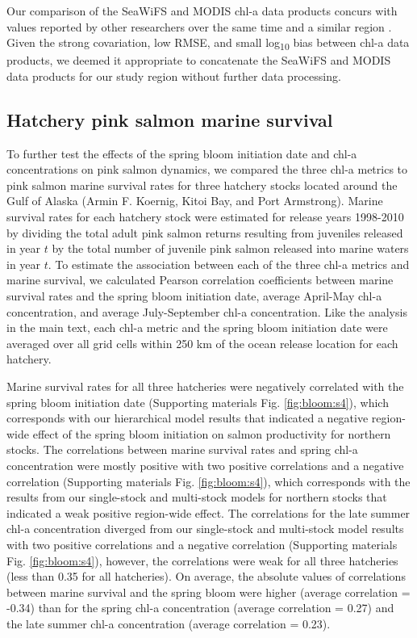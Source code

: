 Our comparison of the SeaWiFS and MODIS chl-a data products concurs with values
reported by other researchers over the same time and a similar region
\citep{Waite2013}. Given the strong covariation, low RMSE, and small
log\textsubscript{10} bias between chl-a data products, we deemed it appropriate
to concatenate the SeaWiFS and MODIS data products for our study region without
further data processing.


\subsection{Hatchery pink salmon marine survival}
\label{supp:bloom:B}

To further test the effects of the spring bloom initiation date and chl-a
concentrations on pink salmon dynamics, we compared the three chl-a metrics to
pink salmon marine survival rates for three hatchery stocks located around the
Gulf of Alaska (Armin F. Koernig, Kitoi Bay, and Port Armstrong). Marine
survival rates for each hatchery stock were estimated for release years
1998-2010 by dividing the total adult pink salmon returns resulting from
juveniles released in year \(t\) by the total number of juvenile pink salmon
released into marine waters in year \(t\). To estimate the association between
each of the three chl-a metrics and marine survival, we calculated Pearson
correlation coefficients between marine survival rates and the spring bloom
initiation date, average April-May chl-a concentration, and average
July-September chl-a concentration. Like the analysis in the main text, each
chl-a metric and the spring bloom initiation date were averaged over all grid
cells within 250 km of the ocean release location for each hatchery.

Marine survival rates for all three hatcheries were negatively correlated with
the spring bloom initiation date (Supporting materials Fig.
\ref{fig:bloom:s4}), which corresponds with our hierarchical model results that
indicated a negative region-wide effect of the spring bloom initiation on salmon
productivity for northern stocks. The correlations between marine survival rates
and spring chl-a concentration were mostly positive with two positive
correlations and a negative correlation (Supporting materials Fig.
\ref{fig:bloom:s4}), which corresponds with the results from our single-stock
and multi-stock models for northern stocks that indicated a weak positive
region-wide effect. The correlations for the late summer chl-a concentration
diverged from our single-stock and multi-stock model results with two positive
correlations and a negative correlation (Supporting materials Fig.
\ref{fig:bloom:s4}), however, the correlations were weak for all three
hatcheries (less than 0.35 for all hatcheries). On average, the absolute values
of correlations between marine survival and the spring bloom were higher
(average correlation = -0.34) than for the spring chl-a concentration (average
correlation = 0.27) and the late summer chl-a concentration (average correlation
= 0.23).

